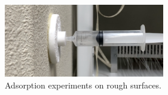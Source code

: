 \documentclass[uplatex,dvipdfmx]{jlreq}
\begin{document}
\begin{figure}[b]
    \centering
    \includegraphics[width=70mm]{./figure/gelsuckerex.PNG}
    \caption{Adsorption experiments on rough surfaces.}
    \label{fig:Adsorption experiments on rough surfaces}
\end{figure}

\end{document}
